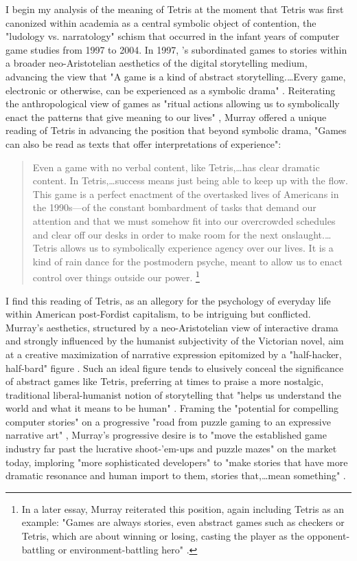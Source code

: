 I begin my analysis of the meaning of Tetris at the moment that Tetris was first canonized within academia as a central symbolic object of contention, the "ludology vs. narratology" schism that occurred in the infant years of computer game studies from 1997 to 2004. In 1997, \citeauthor{Murray1997}'s  subordinated games to stories within a broader neo-Aristotelian aesthetics of the digital storytelling medium, advancing the view that "A game is a kind of abstract storytelling.…Every game, electronic or otherwise, can be experienced as a symbolic drama" \autocite[142]{Murray1997}. Reiterating the anthropological view of games as "ritual actions allowing us to symbolically enact the patterns that give meaning to our lives" \autocite[143]{Murray1997}, Murray offered a unique reading of Tetris in advancing the position that beyond symbolic drama, "Games can also be read as texts that offer interpretations of experience":
\blockquote{
  Even a game with no verbal content, like Tetris,…has clear dramatic content. In Tetris,…success means just being able to keep up with the flow. This game is a perfect enactment of the overtasked lives of Americans in the 1990s---of the constant bombardment of tasks that demand our attention and that we must somehow fit into our overcrowded schedules and clear off our desks in order to make room for the next onslaught.…Tetris allows us to symbolically experience agency over our lives. It is a kind of rain dance for the postmodern psyche, meant to allow us to enact control over things outside our power. \autocite[143--4]{Murray1997}\footnote{
    In a later essay, Murray reiterated this position, again including Tetris as an example: "Games are always stories, even abstract games such as checkers or Tetris, which are about winning or losing, casting the player as the opponent-battling or environment-battling hero" \autocite*[2]{Murray2004}.
  }}
I find this reading of Tetris, as an allegory for the psychology of everyday life within American post-Fordist capitalism, to be intriguing but conflicted. Murray's aesthetics, structured by a neo-Aristotelian view of interactive drama and strongly influenced by the humanist subjectivity of the Victorian novel, aim at a creative maximization of narrative expression epitomized by a "half-hacker, half-bard" figure \autocite*[9]{Murray1997}. Such an ideal figure tends to elusively conceal the significance of abstract games like Tetris, preferring at times to praise a more nostalgic, traditional liberal-humanist notion of storytelling that "helps us understand the world and what it means to be human" \autocite[26]{Murray1997}. Framing the "potential for compelling computer stories" on a progressive "road from puzzle gaming to an expressive narrative art" \autocite[53]{Murray1997}, Murray's progressive desire is to "move the established game industry far past the lucrative shoot-'em-ups and puzzle mazes" on the market today, imploring "more sophisticated developers" to "make stories that have more dramatic resonance and human import to them, stories that,…mean something" \autocite[54]{Murray1997}.

